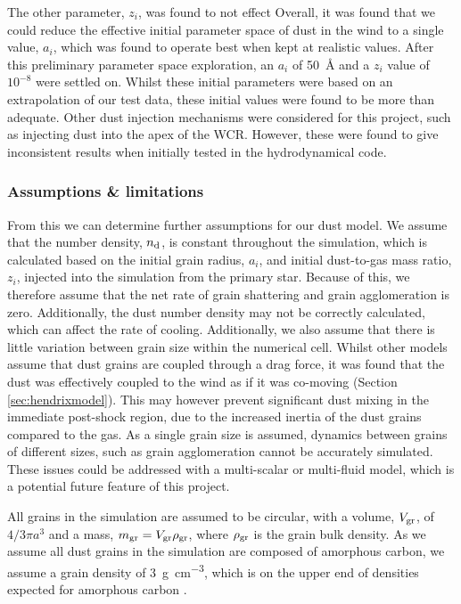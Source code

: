 The other parameter, $z_i$, was found to not effect
Overall, it was found that we could reduce the effective initial parameter space of dust in the wind to a single value, $a_i$, which was found to operate best when kept at realistic values.
After this preliminary parameter space exploration, an $a_i$ of \SI{50}{\angstrom} and a $z_i$ value of $10^{-8}$ were settled on.
Whilst these initial parameters were based on an extrapolation of our test data, these initial values were found to be more than adequate.
Other dust injection mechanisms were considered for this project, such as injecting dust into the apex of the WCR.
However, these were found to give inconsistent results when initially tested in the \mg{} hydrodynamical code.

\subsubsection{Assumptions \& limitations}
\label{sec:bidmasassumptions}
\label{sec:bidmaslimitations}

From this we can determine further assumptions for our dust model.
We assume that the number density, $n_\text{d}$, is constant throughout the simulation, which is calculated based on the initial grain radius, $a_i$, and initial dust-to-gas mass ratio, $z_i$, injected into the simulation from the primary star.
Because of this, we therefore assume that the net rate of grain shattering and grain agglomeration is zero.
Additionally, the dust number density may not be correctly calculated, which can affect the rate of cooling.
Additionally, we also assume that there is little variation between grain size within the numerical cell.
Whilst other models assume that dust grains are coupled through a drag force, it was found that the dust was effectively coupled to the wind as if it was co-moving (Section \ref{sec:hendrixmodel}).
This may however prevent significant dust mixing in the immediate post-shock region, due to the increased inertia of the dust grains compared to the gas.
As a single grain size is assumed, dynamics between grains of different sizes, such as grain agglomeration cannot be accurately simulated.
These issues could be addressed with a multi-scalar or multi-fluid model, which is a potential future feature of this project.

All grains in the simulation are assumed to be circular, with a volume, $V_\text{gr}$, of $4/3 \pi a^3$ and a mass, $m_\text{gr} = V_\text{gr} \rho_\text{gr}$, where $\rho_\text{gr}$ is the grain bulk density.
As we assume all dust grains in the simulation are composed of amorphous carbon, we assume a grain density of \SI{3}{g.cm^{-3}}, which is on the upper end of densities expected for amorphous carbon
\parencite{bhattaraiEvolutionAmorphousCarbon2018}.

